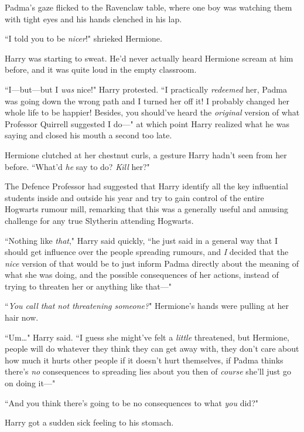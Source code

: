 Padma's gaze flicked to the Ravenclaw table, where one boy was watching them with tight eyes and his hands clenched in his lap.


``I told you to be \emph{nicer}!" shrieked Hermione.

Harry was starting to sweat. He'd never actually heard Hermione scream at him before, and it was quite loud in the empty classroom.

``I—but—but I \emph{was} nice!" Harry protested. ``I practically \emph{redeemed} her, Padma was going down the wrong path and I turned her off it! I probably changed her whole life to be happier! Besides, you should've heard the \emph{original} version of what Professor Quirrell suggested I do—" at which point Harry realized what he was saying and closed his mouth a second too late.

Hermione clutched at her chestnut curls, a gesture Harry hadn't seen from her before. ``What'd \emph{he} say to do? \emph{Kill} her?"

The Defence Professor had suggested that Harry identify all the key influential students inside and outside his year and try to gain control of the entire Hogwarts rumour mill, remarking that this was a generally useful and amusing challenge for any true Slytherin attending Hogwarts.

``Nothing like \emph{that}," Harry said quickly, ``he just said in a general way that I should get influence over the people spreading rumours, and \emph{I} decided that the \emph{nice} version of that would be to just inform Padma directly about the meaning of what she was doing, and the possible consequences of her actions, instead of trying to threaten her or anything like that—"

``\emph{You call that not threatening someone?}" Hermione's hands were pulling at her hair now.

``Um{\ldots}" Harry said. ``I guess she might've felt a \emph{little} threatened, but Hermione, people will do whatever they think they can get away with, they don't care about how much it hurts other people if it doesn't hurt themselves, if Padma thinks there's \emph{no} consequences to spreading lies about you then of \emph{course} she'll just go on doing it—"

``And you think there's going to be no consequences to what \emph{you} did?"

Harry got a sudden sick feeling to his stomach.

